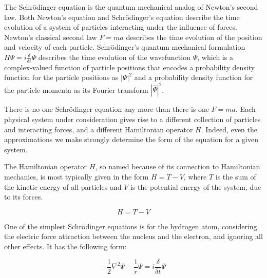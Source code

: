 \documentclass{article}
\begin{document}

The Schr\"odinger equation is the quantum mechanical analog of Newton's second law.
Both Newton's equation and Schr\"odinger's equation
describe the time evolution of a system
of particles interacting under the influence of forces.
Newton's classical second law $F=ma$
describes the time evolution of the position and velocity of each particle.
Schr\"odinger's quantum mechanical formulation $H\Psi=i\frac{\delta}{\delta t} \Psi$
describes the time evolution
of the wavefunction $\Psi$, which is a complex-valued function of particle positions
that encodes a probability density function for
the particle positions as $|\Psi|^2$ and a probability density function
for the particle momenta as its Fourier transform $|\hat{\Psi}|^2$.

There is no one Schr\"odinger equation any more than there is one $F=ma$.
Each physical system under consideration gives rise to a different collection
of particles and interacting forces, and a different Hamiltonian operator $H$.
Indeed, even the approximations we
make strongly determine the form of the equation for a given system.

The Hamiltonian operator $H$, so named because of its connection to Hamiltonian
mechanics, is most typically given in the form $H=T-V$, where $T$ is the
sum of the kinetic energy of all particles and $V$ is the potential energy
of the system, due to its forces.

\begin{equation*}
H=T-V
\end{equation*}

One of the simplest Schr\"odinger equations is for the hydrogen atom,
considering the electric force attraction between the nucleus and
the electron, and ignoring all other effects.  It has the following form:

\begin{equation*}
-\frac{1}{2}\nabla^2 \Psi - \frac{1}{r}\Psi = i \frac{\delta}{\delta t} \Psi
\end{equation*}
\end{document}
